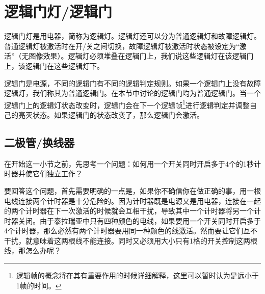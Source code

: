 \begin{figure}[!h]
\begin{center}
\qquad\qquad
{}
\end{center}
\caption{}
\label{i32:33}
\end{figure}

\section{逻辑门灯/逻辑门}

逻辑门灯是用电器，简称为逻辑灯。逻辑灯还可以分为普通逻辑灯和故障逻辑灯。普通逻辑灯被激活时在开/关之间切换，故障逻辑灯被激活时状态被设定为“激活”（无图像效果）。逻辑灯必须堆叠在逻辑门上，我们说这些逻辑灯在该逻辑门上，该逻辑门在这些逻辑灯下。

逻辑门是电源，不同的逻辑门有不同的逻辑判定规则。如果一个逻辑门上没有故障逻辑灯，我们称其为普通逻辑门。在本节中讨论的逻辑门均为普通逻辑门。当一个逻辑门上的逻辑灯状态改变时，逻辑门会在下一个逻辑帧\footnote{逻辑帧的概念将在其有重要作用的时候详细解释，这里可以暂时认为是远小于1帧的时间。}进行逻辑判定并调整自己的亮灭状态。如果逻辑门的状态改变了，那么逻辑门会激活。

\subsection{二极管/换线器}

在开始这一小节之前，先思考一个问题：如何用一个开关同时开启多于4个的1秒计时器并使它们独立工作？

要回答这个问题，首先需要明确的一点是，如果你不确信你在做正确的事，用一根电线连接两个计时器是十分危险的。因为计时器既是电源又是用电器，连接在一起的两个计时器在下一次激活的时候就会互相干扰，导致其中一个计时器将另一个计时器关闭。由于泰拉瑞亚中只有四种颜色的电线，如果要用一个开关同时开启多于4个计时器，那么必然有两个计时器要用同一种颜色的线激活。然而要让它们互不干扰，就意味着这两根线不能连接。同时又必须用大小只有1格的开关控制这两根线，那怎么办呢？

